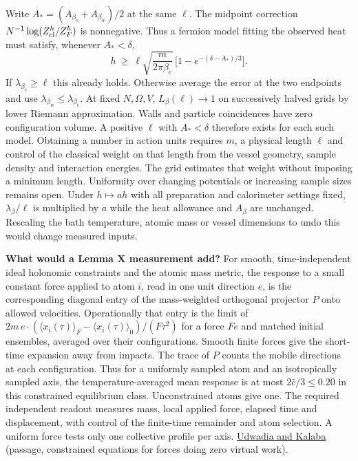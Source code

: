 \documentclass[11pt,a4paper]{article}
\begin{document}
Write \(A_*=(A_{\beta_c}+A_{\beta_w})/2\) at the same \(\ell\). The
midpoint correction \(N^{-1}\log(Z_{\rm cl}^h/Z_F^h)\) is nonnegative.
Thus a fermion model fitting the observed heat must satisfy, whenever
\(A_*<\delta\), \[
 h\ \ge\ \ell\sqrt{\frac{m}{2\pi\beta_c}}\,
                  \big[1-e^{-(\delta-A_*)/3}\big].
\] If \(\lambda_{\beta_c}\ge\ell\) this already holds. Otherwise average
the error at the two endpoints and use \(\lambda_{\beta_w}\le
\lambda_{\beta_c}\). At fixed \(N,\Omega,V\), \(L_\beta(\ell)\to1\) on
successively halved grids by lower Riemann approximation. Walls and
particle coincidences have zero configuration volume. A positive
\(\ell\) with \(A_*<\delta\) therefore exists for each such model.
Obtaining a number in action units requires \(m\), a physical length
\(\ell\) and control of the classical weight on that length from the
vessel geometry, sample density and interaction energies. The grid
estimates that weight without imposing a minimum length. Uniformity over
changing potentials or increasing sample sizes remains open. Under
\(h\mapsto a h\) with all preparation and calorimeter settings fixed,
\(\lambda_\beta/\ell\) is multiplied by \(a\) while the heat allowance
and \(A_\beta\) are unchanged. Rescaling the bath temperature, atomic
mass or vessel dimensions to undo this would change measured inputs.

\textbf{What would a Lemma X measurement add?} For smooth,
time-independent ideal holonomic constraints and the atomic mass metric,
the response to a small constant force applied to atom \(i\), read in
one unit direction \(e\), is the corresponding diagonal entry of the
mass-weighted orthogonal projector \(P\) onto allowed velocities.
Operationally that entry is the limit of
\(2m\, e\cdot(\langle x_i(\tau)\rangle_F-\langle x_i(\tau)\rangle_0)/
(F\tau^2)\) for a force \(Fe\) and matched initial ensembles, averaged
over their configurations. Smooth finite forces give the short-time
expansion away from impacts. The trace of \(P\) counts the mobile
directions at each configuration. Thus for a uniformly sampled atom and
an isotropically sampled axis, the temperature-averaged mean response is
at most \(2\bar c/3\le0.20\) in this constrained equilibrium class.
Unconstrained atoms give one. The required independent readout measures
mass, local applied force, elapsed time and displacement, with control
of the finite-time remainder and atom selection. A uniform force tests
only one collective profile per axis.
\href{https://doi.org/10.1115/1.1459071}{Udwadia and Kalaba} (passage,
constrained equations for forces doing zero virtual work).
\end{document}
